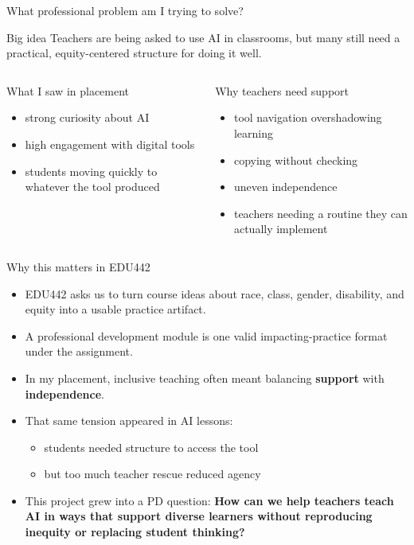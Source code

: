 \documentclass[aspectratio=169,11pt]{beamer}
\newcommand{\bigidea}[1]{
  \begin{block}{Big idea}
  \Large #1
  \end{block}
}
\begin{document}
\begin{frame}{What professional problem am I trying to solve?}
\bigidea{Teachers are being asked to use AI in classrooms, but many still need a practical, equity-centered structure for doing it well.}

\vspace{0.2cm}
\begin{columns}[T]
  \begin{block}{What I saw in placement}
  \begin{itemize}
    \item strong curiosity about AI
    \item high engagement with digital tools
    \item students moving quickly to whatever the tool produced
  \end{itemize}
  \end{block}

  \begin{block}{Why teachers need support}
  \begin{itemize}
    \item tool navigation overshadowing learning
    \item copying without checking
    \item uneven independence
    \item teachers needing a routine they can actually implement
  \end{itemize}
  \end{block}
\end{columns}
\end{frame}

\begin{frame}{Why this matters in EDU442}
\begin{itemize}
  \item EDU442 asks us to turn course ideas about race, class, gender, disability, and equity into a usable practice artifact.
  \item A professional development module is one valid impacting-practice format under the assignment.
  \item In my placement, inclusive teaching often meant balancing \textbf{support} with \textbf{independence}.
  \item That same tension appeared in AI lessons:
  \begin{itemize}
    \item students needed structure to access the tool
    \item but too much teacher rescue reduced agency
  \end{itemize}
  \item This project grew into a PD question: \textbf{How can we help teachers teach AI in ways that support diverse learners without reproducing inequity or replacing student thinking?}
\end{itemize}
\end{frame}
\end{document}
